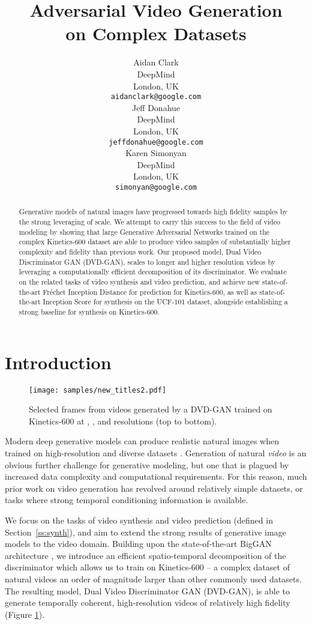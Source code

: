 \documentclass{article} \usepackage{iclr2020_conference,times}
\title{Adversarial Video Generation \\on Complex Datasets}
\author{Aidan Clark\\
  DeepMind\\
  London, UK \\
  \texttt{aidanclark@google.com} \\
  \And
  Jeff Donahue\\
  DeepMind\\
  London, UK \\
  \texttt{jeffdonahue@google.com} \\
  \And
  Karen Simonyan\\
  DeepMind\\
  London, UK \\
  \texttt{simonyan@google.com} \\
}
\begin{document}
\maketitle

\begin{abstract}
Generative models of natural images have progressed towards high fidelity samples by the strong leveraging of scale. We attempt to carry this success to the field of video modeling by showing that large Generative Adversarial Networks trained on the complex Kinetics-600 dataset are able to produce video samples of substantially higher complexity and fidelity than previous work. Our proposed model, Dual Video Discriminator GAN (DVD-GAN), scales to longer and higher resolution videos by leveraging a computationally efficient decomposition of its discriminator. We evaluate on the related tasks of video synthesis and video prediction, and achieve new state-of-the-art Fr\'echet Inception Distance for prediction for Kinetics-600, as well as state-of-the-art Inception Score for synthesis on the UCF-101 dataset, alongside establishing a strong baseline for synthesis on Kinetics-600.
\end{abstract}

\section{Introduction}

\begin{figure}[h]
\centering
\texttt{[image: samples/new\_titles2.pdf]}
\vspace{-0em}
\caption{Selected frames from videos generated by a DVD-GAN trained on Kinetics-600 at , , and  resolutions (top to bottom).}
\label{fig:court}
\end{figure}

Modern deep generative models can produce realistic natural images when trained on high-resolution and diverse datasets \citep{brock2018large, karras2018style, kingma2018glow, menick2018generating, razavi2019generating}. Generation of natural \textit{video} is an obvious further challenge for generative modeling, but one that is plagued by increased data complexity and computational requirements. For this reason, much prior work on video generation has revolved around relatively simple datasets, or tasks where strong temporal conditioning information is available.

We focus on the tasks of video synthesis and video prediction (defined in Section~\ref{ss:synth}), and aim to extend the strong results of generative image models to the video domain. Building upon the state-of-the-art BigGAN architecture \citep{brock2018large}, we introduce an efficient spatio-temporal decomposition of the discriminator which allows us to train on Kinetics-600 -- a complex dataset of natural videos an order of magnitude larger than other commonly used datasets. The resulting model, Dual Video Discriminator GAN (DVD-GAN), is able to generate temporally coherent, high-resolution videos of relatively high fidelity (Figure \ref{fig:court}).
\end{document}

